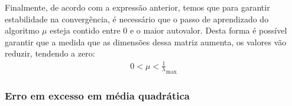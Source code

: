 Finalmente, de acordo com a expressão anterior, temos que para garantir estabilidade na convergência, é necessário que o passo de aprendizado do algoritmo $\mu$ esteja contido entre $0$ e o maior autovalor. Desta forma é possível garantir que a medida que as dimensões dessa matriz aumenta, os valores vão reduzir, tendendo a zero:
\begin{align*}
    0 < \mu < \frac{1}{\lambda}_{\text{max}}
\end{align*}

\clearpage

\subsubsection*{Erro em excesso em média quadrática}







